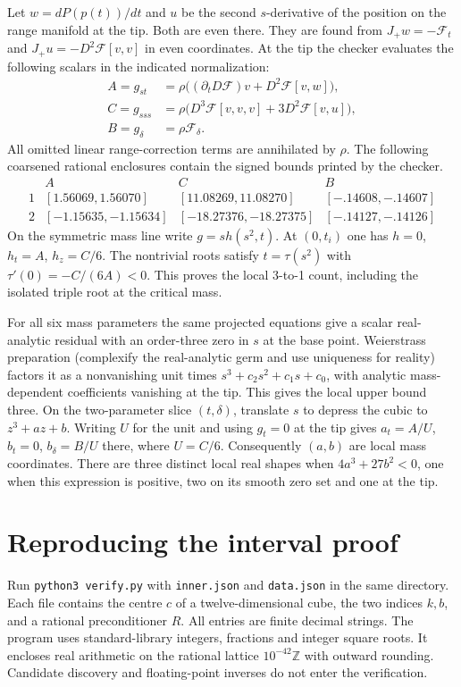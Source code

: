 \documentclass[11pt]{article}
\newcommand{\F}{\mathcal F}
\begin{document}
Let $w= dP(p(t))/dt$ and $u$ be the second $s$-derivative of the position
on the range manifold at the tip. Both are even there. They are found
from $J_+w=-\F_t$ and $J_+u=-D^2\F[v,v]$ in even coordinates. At the
tip the checker evaluates the following scalars in the indicated
normalization:
\begin{align*}
 A=g_{st}&=\rho\big((\partial_tD\F)v+D^2\F[v,w]\big),\\
 C=g_{sss}&=\rho\big(D^3\F[v,v,v]+3D^2\F[v,u]\big),\\
 B=g_{\delta}&=\rho\F_{\delta}.
\end{align*}
All omitted linear range-correction terms are annihilated by $\rho$.
The following coarsened rational enclosures contain the signed bounds
printed by the checker.
\[
\begin{array}{c|ccc}
 & A&C&B\\ \hline
1 &[1.56069,1.56070]&[11.08269,11.08270]&[-.14608,-.14607]\\
2 &[-1.15635,-1.15634]&[-18.27376,-18.27375]&[-.14127,-.14126]
\end{array}
\]
On the symmetric mass line write $g=s h(s^2,t)$. At $(0,t_i)$ one has
$h=0$, $h_t=A$, $h_z=C/6$. The nontrivial roots satisfy
$t=\tau(s^2)$ with $\tau'(0)=-C/(6A)<0$.
This proves the local 3-to-1 count, including the isolated triple root
at the critical mass.

For all six mass parameters the same projected equations give a scalar
real-analytic residual with an order-three zero in $s$ at the base point.
Weierstrass preparation \cite{lebl} (complexify the real-analytic germ and
use uniqueness for reality) factors it as a nonvanishing unit times
$s^3+c_2s^2+c_1s+c_0$, with analytic mass-dependent coefficients vanishing
at the tip. This gives the local upper bound three. On the two-parameter
slice $(t,\delta)$, translate $s$ to depress the cubic to $z^3+a z+b$.
Writing $U$ for the unit and using $g_t=0$ at the tip gives
$a_t=A/U$, $b_t=0$, $b_\delta=B/U$ there, where $U=C/6$.
Consequently $(a,b)$ are local mass coordinates. There are three distinct
local real shapes when $4a^3+27b^2<0$, one when this expression is
positive, two on its smooth zero set and one at the tip.

\newpage
\section{Reproducing the interval proof}
Run \texttt{python3 verify.py} with \texttt{inner.json} and \texttt{data.json}
in the same directory. Each file contains the centre $c$ of a
twelve-dimensional cube, the two indices $k,b$, and a rational
preconditioner $R$. All entries are finite decimal strings. The program
uses standard-library integers, fractions and integer square roots. It
encloses real arithmetic on the rational lattice $10^{-42}\mathbb Z$ with
outward rounding. Candidate discovery and floating-point inverses do not enter
the verification.
\end{document}
